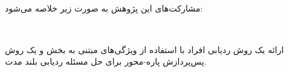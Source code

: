 


‫





‫








‫


‫

مشارکت‌های این پژوهش به صورت زیر خلاصه می‌شود:

‫‫‫


 ارائه یک روش ردیابی افراد با استفاده از ویژگی‌های مبتنی به بخش و یک روش پس‌پردازش پاره-محور برای حل مسئله ردیابی بلند مدت.




‫

‫
‫


\newpage